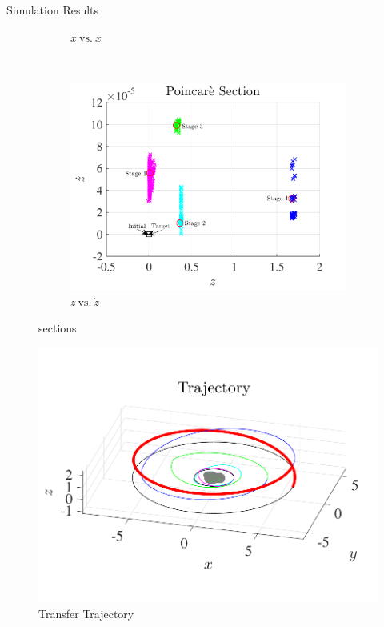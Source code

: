 \documentclass[final, usenames, dvipsnames]{beamer}
\newlength{\onecolwidth}
\begin{document}
\begin{frame}[t]
\begin{columns}[T,onlytextwidth]
\begin{column}{\onecolwidth}
\begin{block}{Simulation Results}
\begin{figure}[htbp]
\begin{subfigure}[htbp]{0.5\textwidth}
            \caption*{\(x~\text{vs.}~\dot{x} \)}
        \end{subfigure}~ %
        \begin{subfigure}[htbp]{0.5\textwidth} 
            \includegraphics[width=\textwidth]{figures/poincare_zvszdot.pdf} 
            \caption*{\(z~\text{vs.}~\dot{z} \)} 
        \end{subfigure}
        \caption*{\Poincare sections}
        
    \end{figure}
    \begin{figure}[htbp] 
        \centering 
        \includegraphics[width=\columnwidth]{figures/trajectory_3d.pdf}
        \caption*{Transfer Trajectory}
    \end{figure}



\end{block}
\end{column}
\end{columns}
\end{frame}
\end{document}
